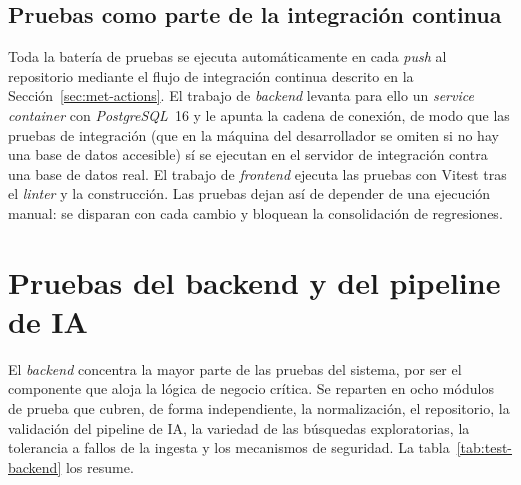 \subsection{Pruebas como parte de la integración continua}
\label{sec:test-ci}

Toda la batería de pruebas se ejecuta automáticamente en cada \emph{push} al
repositorio mediante el flujo de integración continua descrito en la
Sección~\ref{sec:met-actions}. El trabajo de \emph{backend} levanta para ello un
\emph{service container} con \emph{PostgreSQL}~16 y le apunta la cadena de
conexión, de modo que las pruebas de integración (que en la máquina del
desarrollador se omiten si no hay una base de datos accesible) sí se ejecutan en
el servidor de integración contra una base de datos real. El trabajo de
\emph{frontend} ejecuta las pruebas con Vitest tras el \emph{linter} y la
construcción. Las pruebas dejan así de depender de una ejecución manual: se
disparan con cada cambio y bloquean la consolidación de regresiones.

\section{Pruebas del backend y del pipeline de IA}
\label{sec:test-backend}

El \emph{backend} concentra la mayor parte de las pruebas del sistema, por ser el
componente que aloja la lógica de negocio crítica. Se reparten en ocho módulos de
prueba que cubren, de forma independiente, la normalización, el repositorio, la
validación del pipeline de IA, la variedad de las búsquedas exploratorias, la
tolerancia a fallos de la ingesta y los mecanismos de seguridad. La
tabla~\ref{tab:test-backend} los resume.

